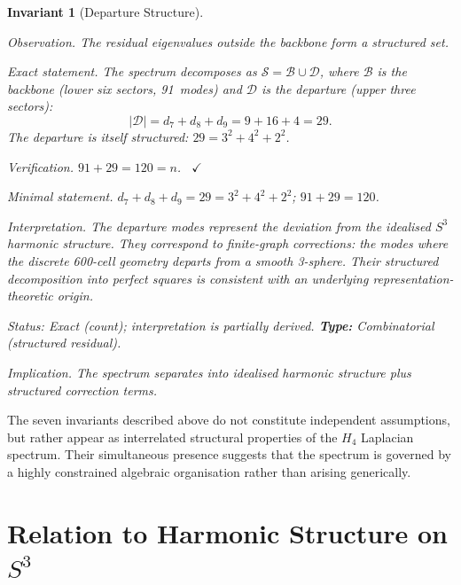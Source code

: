 \documentclass[12pt,a4paper]{article}
\newcommand{\Hfour}{H_4}
\newtheorem{invariant}{Invariant}
\begin{document}
\begin{invariant}[Departure Structure]\label{inv:departure}

\emph{Observation.}
The residual eigenvalues outside the backbone form a structured set.

\emph{Exact statement.}
The spectrum decomposes as
$\mathcal{S} = \mathcal{B} \cup \mathcal{D}$, where
$\mathcal{B}$ is the backbone (lower six sectors, 91~modes) and
$\mathcal{D}$ is the departure (upper three sectors):
\begin{equation}\label{eq:29}
  |\mathcal{D}| = d_7 + d_8 + d_9 = 9 + 16 + 4 = 29.
\end{equation}
The departure is itself structured: $29 = 3^2 + 4^2 + 2^2$.

\emph{Verification.}
$91 + 29 = 120 = n$. \ $\checkmark$

\emph{Minimal statement.}
$d_7 + d_8 + d_9 = 29 = 3^2 + 4^2 + 2^2$; \; $91 + 29 = 120$.

\emph{Interpretation.}
The departure modes represent the deviation from the idealised
$S^3$ harmonic structure.  They correspond to finite-graph
corrections: the modes where the discrete 600-cell geometry
departs from a smooth 3-sphere.  Their structured decomposition
into perfect squares is consistent with an underlying
representation-theoretic origin.

\emph{Status:} Exact (count); interpretation is partially derived. \quad
\textbf{Type:} Combinatorial (structured residual).

\emph{Implication.}
The spectrum separates into idealised harmonic structure plus
structured correction terms.
\end{invariant}

\bigskip

The seven invariants described above do not constitute independent
assumptions, but rather appear as interrelated structural properties
of the $\Hfour$ Laplacian spectrum.  Their simultaneous presence
suggests that the spectrum is governed by a highly constrained
algebraic organisation rather than arising generically.


\section{Relation to Harmonic Structure on \texorpdfstring{$S^3$}{S³}}
\label{sec:harmonics}
\end{document}

